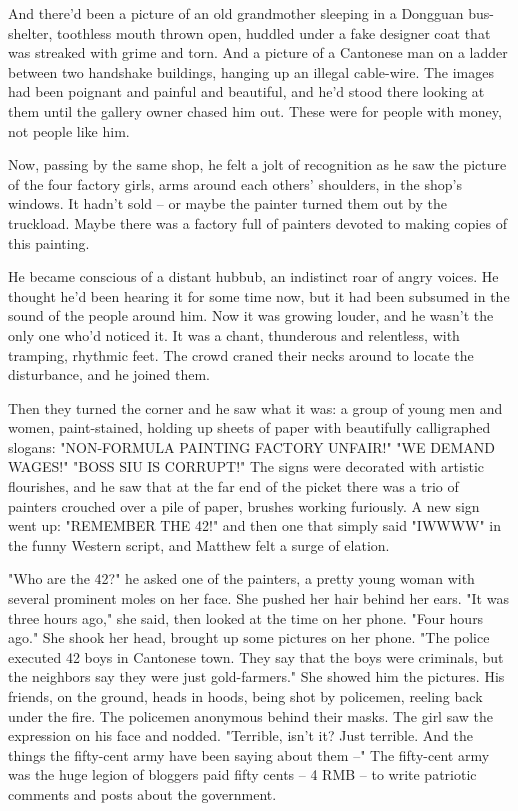 And there'd been a picture of an old grandmother sleeping in a
Dongguan bus-shelter, toothless mouth thrown open, huddled under a
fake designer coat that was streaked with grime and torn. And a
picture of a Cantonese man on a ladder between two handshake
buildings, hanging up an illegal cable-wire. The images had been
poignant and painful and beautiful, and he'd stood there looking at
them until the gallery owner chased him out. These were for people
with money, not people like him.

Now, passing by the same shop, he felt a jolt of recognition as he
saw the picture of the four factory girls, arms around each others'
shoulders, in the shop's windows. It hadn't sold -- or maybe the
painter turned them out by the truckload. Maybe there was a factory
full of painters devoted to making copies of this painting.

He became conscious of a distant hubbub, an indistinct roar of
angry voices. He thought he'd been hearing it for some time now,
but it had been subsumed in the sound of the people around him. Now
it was growing louder, and he wasn't the only one who'd noticed it.
It was a chant, thunderous and relentless, with tramping, rhythmic
feet. The crowd craned their necks around to locate the
disturbance, and he joined them.

Then they turned the corner and he saw what it was: a group of
young men and women, paint-stained, holding up sheets of paper with
beautifully calligraphed slogans: "NON-FORMULA PAINTING FACTORY
UNFAIR!" "WE DEMAND WAGES!" "BOSS SIU IS CORRUPT!" The signs were
decorated with artistic flourishes, and he saw that at the far end
of the picket there was a trio of painters crouched over a pile of
paper, brushes working furiously. A new sign went up: "REMEMBER THE
42!" and then one that simply said "IWWWW" in the funny Western
script, and Matthew felt a surge of elation.

"Who are the 42?" he asked one of the painters, a pretty young
woman with several prominent moles on her face. She pushed her hair
behind her ears. "It was three hours ago," she said, then looked at
the time on her phone. "Four hours ago." She shook her head,
brought up some pictures on her phone. "The police executed 42 boys
in Cantonese town. They say that the boys were criminals, but the
neighbors say they were just gold-farmers." She showed him the
pictures. His friends, on the ground, heads in hoods, being shot by
policemen, reeling back under the fire. The policemen anonymous
behind their masks. The girl saw the expression on his face and
nodded. "Terrible, isn't it? Just terrible. And the things the
fifty-cent army have been saying about them --" The fifty-cent army
was the huge legion of bloggers paid fifty cents -- 4 RMB -- to
write patriotic comments and posts about the government.

